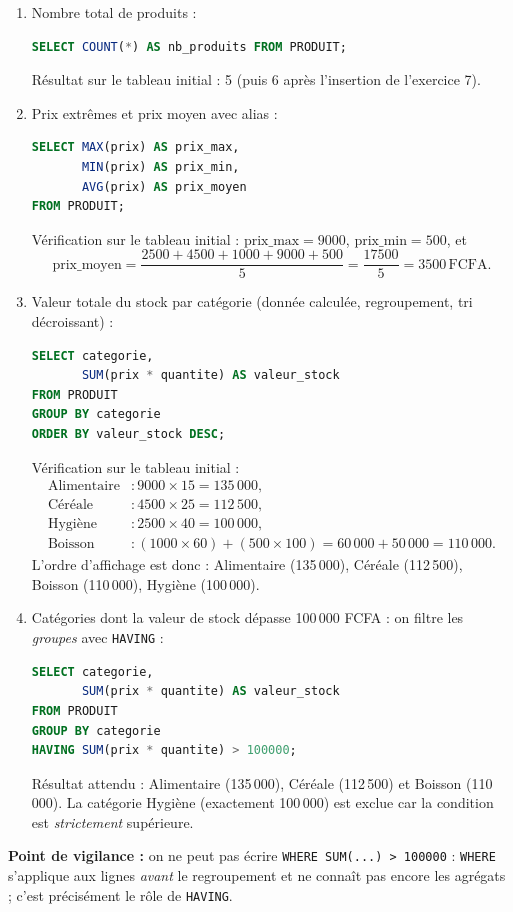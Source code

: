 \documentclass[11pt]{article}
\begin{document}
\begin{corrige}
\begin{enumerate}
\item Nombre total de produits :
\begin{lstlisting}[language=SQL]
SELECT COUNT(*) AS nb_produits FROM PRODUIT;
\end{lstlisting}
Résultat sur le tableau initial : 5 (puis 6 après l'insertion de l'exercice 7).
\item Prix extrêmes et prix moyen avec alias :
\begin{lstlisting}[language=SQL]
SELECT MAX(prix) AS prix_max,
       MIN(prix) AS prix_min,
       AVG(prix) AS prix_moyen
FROM PRODUIT;
\end{lstlisting}
Vérification sur le tableau initial : $\text{prix\_max} = 9000$, $\text{prix\_min} = 500$, et
\[ \text{prix\_moyen} = \frac{2500 + 4500 + 1000 + 9000 + 500}{5} = \frac{17500}{5} = 3500\,\text{FCFA}. \]
\item Valeur totale du stock par catégorie (donnée calculée, regroupement, tri décroissant) :
\begin{lstlisting}[language=SQL]
SELECT categorie,
       SUM(prix * quantite) AS valeur_stock
FROM PRODUIT
GROUP BY categorie
ORDER BY valeur_stock DESC;
\end{lstlisting}
Vérification sur le tableau initial :
\begin{align*}
\text{Alimentaire} &: 9000 \times 15 = 135\,000,\\
\text{Céréale} &: 4500 \times 25 = 112\,500,\\
\text{Hygiène} &: 2500 \times 40 = 100\,000,\\
\text{Boisson} &: (1000 \times 60) + (500 \times 100) = 60\,000 + 50\,000 = 110\,000.
\end{align*}
L'ordre d'affichage est donc : Alimentaire (135\,000), Céréale (112\,500), Boisson (110\,000), Hygiène (100\,000).
\item Catégories dont la valeur de stock dépasse 100\,000 FCFA : on filtre les \emph{groupes} avec \texttt{HAVING} :
\begin{lstlisting}[language=SQL]
SELECT categorie,
       SUM(prix * quantite) AS valeur_stock
FROM PRODUIT
GROUP BY categorie
HAVING SUM(prix * quantite) > 100000;
\end{lstlisting}
Résultat attendu : Alimentaire (135\,000), Céréale (112\,500) et Boisson (110\,000). La catégorie Hygiène (exactement 100\,000) est exclue car la condition est \emph{strictement} supérieure.
\end{enumerate}
\textbf{Point de vigilance :} on ne peut pas écrire \texttt{WHERE SUM(...) > 100000} : \texttt{WHERE} s'applique aux lignes \emph{avant} le regroupement et ne connaît pas encore les agrégats ; c'est précisément le rôle de \texttt{HAVING}.
\end{corrige}
\end{document}
